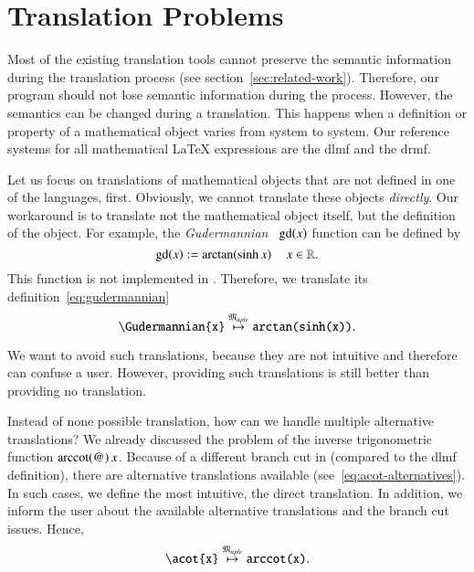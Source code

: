 
\section{Translation Problems}
Most of the existing translation tools cannot preserve the semantic information during the translation process (see section~\ref{sec:related-work}). Therefore, our program should not lose semantic information during the process. However, the semantics can be changed during a translation. This happens when a definition or property of a mathematical object varies from system to system. Our reference systems for all mathematical \LaTeX{} expressions are the \gls{dlmf} and the \gls{drmf}.

Let us focus on translations of mathematical objects that are not defined in one of the languages, first. Obviously, we cannot translate these objects \textit{directly}. Our workaround is to translate not the mathematical object itself, but the definition of the object. For example, the \textit{Gudermannian}~\parencite[(4.23.10)]{NIST:DLMF} $\mathrm{gd}\!\left(x\right)$ function can be defined by
\begin{equation}\label{eq:gudermannian}
\mathrm{gd}\!\left(x\right) := \mathrm{arctan}\!\left(\sinh{x}\right) \quad x \in \mathbb{R}.
\end{equation}
This function is not implemented in \Maple. Therefore, we translate its definition~\eqref{eq:gudermannian}
\begin{equation}\label{eq:guder-trans}
\verb|\Gudermannian{x}| \overset{\langMaple}{\mapsto} \texttt{arctan(sinh(x))}.
\end{equation}

We want to avoid such translations, because they are not intuitive and therefore can confuse a user. However, providing such translations is still better than providing no translation.

Instead of none possible translation, how can we handle multiple alternative translations? We already discussed the problem of the inverse trigonometric function $\acot@{x}$. Because of a different branch cut in \Maple{} (compared to the \gls{dlmf} definition), there are alternative translations available (see~\eqref{eq:acot-alternatives}). In such cases, we define the most intuitive, the direct translation. In addition, we inform the user about the available alternative translations and the branch cut issues. Hence,
\begin{equation}
\verb|\acot{x}| \overset{\langMaple}{\mapsto} \texttt{arccot(x)}.
\end{equation}

